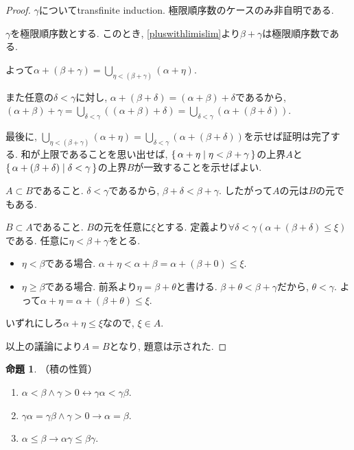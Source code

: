 \documentclass[a4paper, twoside]{bxjsarticle}
\theoremstyle{definition}
\newtheorem{prop}[thm]{命題}
\begin{document}
        \begin{proof}
            $\gamma$についてtransfinite induction. 極限順序数のケースのみ非自明である.
            
            $\gamma$を極限順序数とする. このとき, \ref{pluswithlimislim}より$\beta+\gamma$は極限順序数である.
            
            よって$\alpha+(\beta+\gamma) = \bigcup_{\eta<(\beta+\gamma)}(\alpha+\eta)$.
            
            また任意の$\delta<\gamma$に対し, $\alpha+(\beta+\delta)=(\alpha+\beta)+\delta$であるから, $(\alpha+\beta)+\gamma=\bigcup_{\delta<\gamma}((\alpha+\beta)+\delta)=\bigcup_{\delta<\gamma}(\alpha+(\beta+\delta))$.
            
            最後に, $\bigcup_{\eta<(\beta+\gamma)}(\alpha+\eta) = \bigcup_{\delta<\gamma}(\alpha+(\beta+\delta))$を示せば証明は完了する. 和が上限であることを思い出せば, $\set{\alpha+\eta|\eta<\beta+\gamma}$の上界$A$と$\set{\alpha+(\beta+\delta)|\delta<\gamma}$の上界$B$が一致することを示せばよい.
            
            $A\subset B$であること. $\delta<\gamma$であるから, $\beta+\delta<\beta+\gamma$. したがって$A$の元は$B$の元でもある.
            
            $B\subset A$であること. $B$の元を任意に$\xi$とする. 定義より$\forall \delta<\gamma(\alpha+(\beta+\delta)\leq\xi)$である.
            任意に$\eta<\beta+\gamma$をとる.
            \begin{itemize}
                \item $\eta<\beta$である場合. $\alpha+\eta<\alpha+\beta=\alpha+(\beta+0)\leq\xi$.
                \item $\eta\geq\beta$である場合. 前系より$\eta=\beta+\theta$と書ける. $\beta+\theta<\beta+\gamma$だから, $\theta<\gamma$. よって$\alpha+\eta=\alpha+(\beta+\theta)\leq\xi$.
            \end{itemize}
            いずれにしろ$\alpha+\eta\leq\xi$なので, $\xi\in A$.
            
            以上の議論により$A=B$となり, 題意は示された.
        \end{proof}
        \begin{prop}
            （積の性質）
            
            \begin{enumerate}
                \item $\alpha<\beta\land \gamma>0 \leftrightarrow \gamma\alpha<\gamma\beta$.
                \item $\gamma\alpha=\gamma\beta \land \gamma>0 \to \alpha=\beta$.
                \item $\alpha\leq\beta \to \alpha\gamma\leq\beta\gamma$.
            \end{enumerate}
        \end{prop}
\end{document}
